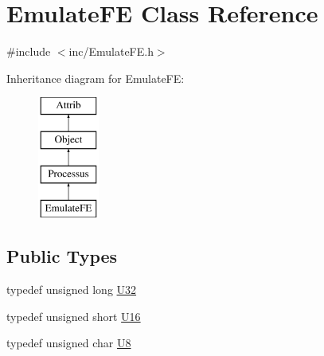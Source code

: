 \hypertarget{classEmulateFE}{}\section{Emulate\+FE Class Reference}
\label{classEmulateFE}


{\ttfamily \#include $<$inc/\+Emulate\+F\+E.\+h$>$}

Inheritance diagram for Emulate\+FE\+:\begin{figure}[H]
\begin{center}
\leavevmode
\includegraphics[height=4.000000cm]{classEmulateFE}
\end{center}
\end{figure}
\subsection*{Public Types}
\begin{DoxyCompactItemize}
\item 
typedef unsigned long \hyperlink{classEmulateFE_abc39ad2fcef684d453760193ac4ddd49}{U32}
\item 
typedef unsigned short \hyperlink{classEmulateFE_ae3af71615d90d5e7ee4de109e8a79c5f}{U16}
\item 
typedef unsigned char \hyperlink{classEmulateFE_a8aa884f739fca2855ff8fb6bf3cddcff}{U8}
\end{DoxyCompactItemize}
